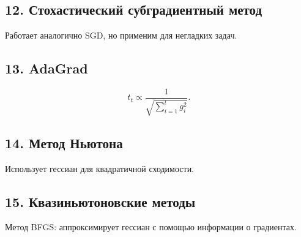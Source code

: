 \documentclass[a4paper,12pt]{article}
\begin{document}
\subsection*{12. Стохастический субградиентный метод}
Работает аналогично SGD, но применим для негладких задач.

\subsection*{13. AdaGrad}
\[
t_t \propto \frac{1}{\sqrt{\sum_{i=1}^t g_i^2}}.
\]

\subsection*{14. Метод Ньютона}
Использует гессиан для квадратичной сходимости.

\subsection*{15. Квазиньютоновские методы}
Метод BFGS: аппроксимирует гессиан с помощью информации о градиентах.
\end{document}
